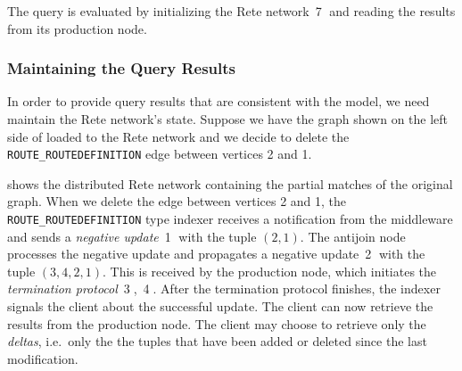 The query is evaluated by initializing the Rete network~\textcircled{7} and reading the results from its production node.

\subsubsection{Maintaining the Query Results}

In order to provide query results that are consistent with the model, we need maintain the Rete network's state. Suppose we have the graph shown on the left side of  loaded to the Rete network and we decide to delete the \texttt{ROUTE\_ROUTEDEFINITION} edge between vertices 2 and 1.


 shows the distributed Rete network containing the partial matches of the original graph. When we delete the edge between vertices 2 and 1, the \texttt{ROUTE\_ROUTEDEFINITION} type indexer receives a notification from the middleware and sends a \textit{negative update}~\textcircled{1} with the tuple $(2, 1)$. The antijoin node processes the negative update and propagates a negative update~\textcircled{2} with the tuple $(3, 4, 2, 1)$. This is received by the production node, which initiates the \textit{termination protocol}~\textcircled{3},~\textcircled{4}. After the termination protocol finishes, the indexer signals the client about the successful update. The client can now retrieve the results from the production node. The client may choose to retrieve only the \emph{deltas}, i.e.\ only the the tuples that have been added or deleted since the last modification.


